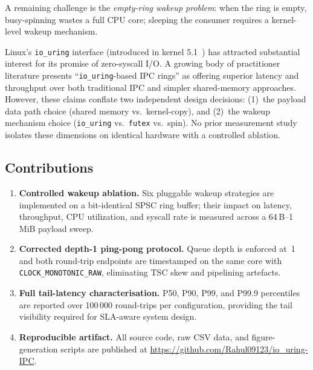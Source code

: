 \documentclass[10pt,conference]{IEEEtran}
\begin{document}
A remaining challenge is the \emph{empty-ring wakeup problem}: when the ring is
empty, busy-spinning wastes a full CPU core; sleeping the consumer requires a
kernel-level wakeup mechanism.

Linux's \texttt{io\_uring} interface (introduced in kernel 5.1~\cite{axboe2019})
has attracted substantial interest for its promise of zero-syscall I/O.  A
growing body of practitioner literature presents ``\texttt{io\_uring}-based IPC
rings'' as offering superior latency and throughput over both traditional IPC
and simpler shared-memory approaches.  However, these claims conflate two
independent design decisions: (1)~the payload data path choice (shared memory
vs.\ kernel-copy), and (2)~the wakeup mechanism choice (\texttt{io\_uring}
vs.\ \texttt{futex} vs.\ spin).  No prior measurement study isolates these
dimensions on identical hardware with a controlled ablation.

\subsection*{Contributions}

\begin{enumerate}
  \item \textbf{Controlled wakeup ablation.}  Six pluggable wakeup strategies
        are implemented on a bit-identical SPSC ring buffer; their impact on
        latency, throughput, CPU utilization, and syscall rate is measured
        across a 64\,B--1\,MiB payload sweep.

  \item \textbf{Corrected depth-1 ping-pong protocol.}  Queue depth is
        enforced at~1 and both round-trip endpoints are timestamped on the
        same core with \texttt{CLOCK\_MONOTONIC\_RAW}, eliminating TSC skew
        and pipelining artefacts.

  \item \textbf{Full tail-latency characterisation.}  P50, P90, P99, and
        P99.9 percentiles are reported over 100\,000 round-trips per
        configuration, providing the tail visibility required for SLA-aware
        system design.

  \item \textbf{Reproducible artifact.}  All source code, raw CSV data, and
        figure-generation scripts are published at
        \url{https://github.com/Rahul09123/io_uring-IPC}.
\end{enumerate}

\end{document}
